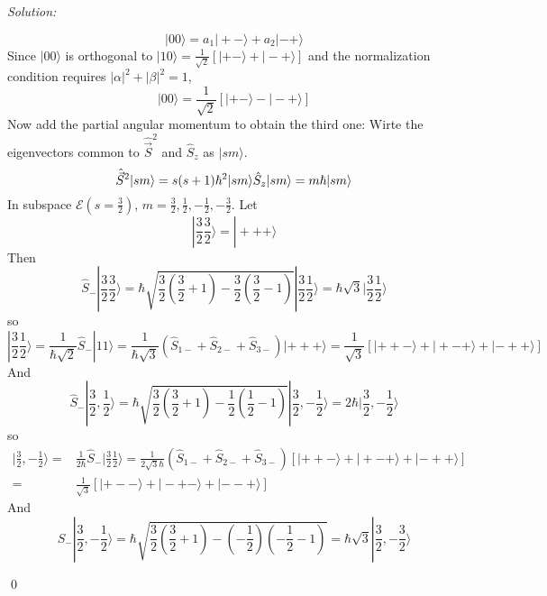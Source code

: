 \documentclass[10pt,a4paper]{article}
\newenvironment{sol}
    {\emph{Solution:}
    }
    {
    \qed
    }
\begin{document}
\begin{sol}
\begin{equation}
|00\rangle=a_1|+-\rangle+a_2|-+\rangle
\end{equation}
Since $|00\rangle$ is orthogonal to $|10\rangle=\frac{1}{\sqrt{2}}[|+-\rangle+|-+\rangle]$ and the normalization condition requires $|\alpha|^2+|\beta|^2=1$,
\begin{equation}
|00\rangle=\frac{1}{\sqrt{2}}[|+-\rangle-|-+\rangle]
\end{equation}
Now add the partial angular momentum to obtain the third one:
Wirte the eigenvectors common to $\hat{\vec{S}}^2$ and $\hat{S}_z$ as $|sm\rangle$.
\begin{equation}
\hat{\vec{S}}^2|sm\rangle=s(s+1)\hbar^2|sm\rangle\\
\hat{S}_z|sm\rangle=m\hbar|sm\rangle
\end{equation}
In subspace $\mathscr{E}(s=\frac{3}{2})$, $m=\frac{3}{2},\frac{1}{2},-\frac{1}{2},-\frac{3}{2}$. Let
\begin{equation}
|\frac{3}{2}\frac{3}{2}\rangle=|+++\rangle
\end{equation}
Then
\begin{equation}
\hat{S}_-|\frac{3}{2}\frac{3}{2}\rangle=\hbar\sqrt{\frac{3}{2}(\frac{3}{2}+1)-\frac{3}{2}(\frac{3}{2}-1)}|\frac{3}{2}\frac{1}{2}\rangle=\hbar\sqrt{3}|\frac{3}{2}\frac{1}{2}\rangle
\end{equation}
so
\begin{equation}
|\frac{3}{2}\frac{1}{2}\rangle=\frac{1}{\hbar\sqrt{2}}\hat{S}_-|11\rangle=\frac{1}{\hbar\sqrt{3}}(\hat{S}_{1-}+\hat{S}_{2-}+\hat{S}_{3-})|+++\rangle=\frac{1}{\sqrt{3}}[|++-\rangle+|+-+\rangle+|-++\rangle]
\end{equation}
And
\begin{equation}
\hat{S}_-|\frac{3}{2},\frac{1}{2}\rangle=\hbar\sqrt{\frac{3}{2}(\frac{3}{2}+1)-\frac{1}{2}(\frac{1}{2}-1)}|\frac{3}{2},-\frac{1}{2}\rangle=2\hbar|\frac{3}{2},-\frac{1}{2}\rangle
\end{equation}
so
\begin{align}
\nonumber|\frac{3}{2},-\frac{1}{2}\rangle=&\frac{1}{2\hbar}\hat{S}_-|\frac{3}{2}\frac{1}{2}\rangle=\frac{1}{2\sqrt{3}\hbar}(\hat{S}_{1-}+\hat{S}_{2-}+\hat{S}_{3-})[|++-\rangle+|+-+\rangle+|-++\rangle]\\
=&\frac{1}{\sqrt{3}}[|+--\rangle+|-+-\rangle+|--+\rangle]
\end{align}
And
\begin{equation}
\hat{S}_-|\frac{3}{2},-\frac{1}{2}\rangle=\hbar\sqrt{\frac{3}{2}(\frac{3}{2}+1)-(-\frac{1}{2})(-\frac{1}{2}-1)}=\hbar\sqrt{3}|\frac{3}{2},-\frac{3}{2}\rangle

\end{equation}
\end{sol}
\end{document}
